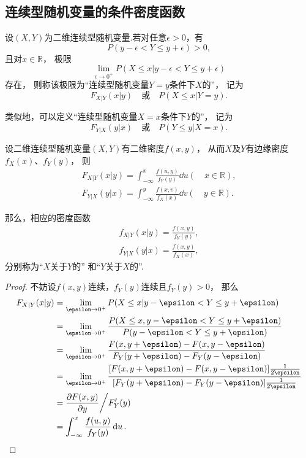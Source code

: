 \subsection{连续型随机变量的条件密度函数}
\begin{definition}
设\((X,Y)\)为二维连续型随机变量.若对任意\(\epsilon > 0\)，有\[
	P(y - \epsilon < Y \leq y + \epsilon) > 0,
\]
且对\(x\in\mathbb{R}\)，
极限\[
	\lim_{\epsilon\to0^+} P(X \leq x \vert y - \epsilon < Y \leq y + \epsilon)
\]存在，
则称该极限为“连续型随机变量\(Y=y\)条件下\(X\)的”，
记为\[
	F_{X \vert Y}(x \vert y)
	\quad\text{或}\quad
	P(X \leq x \vert Y = y).
\]

类似地，可以定义“连续型随机变量\(X=x\)条件下\(Y\)的”，
记为\[
	F_{Y \vert X}(y \vert x)
	\quad\text{或}\quad
	P(Y \leq y \vert X = x).
\]
\end{definition}

\begin{theorem}
设二维连续型随机变量\((X,Y)\)有二维密度\(f(x,y)\)，
从而\(X\)及\(Y\)有边缘密度\(f_X(x)\)、\(f_Y(y)\)，
则\begin{gather*}
	F_{X \vert Y}(x \vert y)
	= \int_{-\infty}^x \frac{f(u,y)}{f_Y(y)}\dd{u}
	(\quad x \in \mathbb{R}), \\
	F_{Y \vert X}(y \vert x)
	= \int_{-\infty}^y \frac{f(x,v)}{f_X(x)}\dd{v}
	(\quad y \in \mathbb{R}).
\end{gather*}

那么，相应的密度函数\begin{gather}
	f_{X \vert Y}(x \vert y)
	= \frac{f(x,y)}{f_Y(y)},
		\label{equation:多维随机变量及其分布.条件密度、联合密度、边缘密度的关系1} \\
	f_{Y \vert X}(y \vert x)
	= \frac{f(x,y)}{f_X(x)},
		\label{equation:多维随机变量及其分布.条件密度、联合密度、边缘密度的关系2}
\end{gather}
分别称为“\(X\)关于\(Y\)的”%
和“\(Y\)关于\(X\)的”.
\begin{proof}
不妨设\(f(x,y)\)连续，\(f_Y(y)\)连续且\(f_Y(y)>0\)，
\def\l{\lim_{\epsilon\to0^+}}%
那么\begin{align*}
	F_{X \vert Y}(x \vert y)
	&= \lim_{\epsilon\to0^+}
		P(X \leq x \vert y - \epsilon < Y \leq y + \epsilon) \\
	&= \lim_{\epsilon\to0^+}
		\frac{
			P(X \leq x, y - \epsilon < Y \leq y + \epsilon)
		}{
			P(y - \epsilon < Y \leq y + \epsilon)
		} \\
	&= \lim_{\epsilon\to0^+}
		\frac{
			F(x,y+\epsilon) - F(x,y-\epsilon)
		}{
			F_Y(y+\epsilon) - F_Y(y-\epsilon)
		} \\
	&= \lim_{\epsilon\to0^+}
		\frac{
			[F(x,y+\epsilon) - F(x,y-\epsilon)] \frac{1}{2 \epsilon}
		}{
			[F_Y(y+\epsilon) - F_Y(y-\epsilon)] \frac{1}{2 \epsilon}
		} \\
	&= \pdv{F(x,y)}{y} \bigg/ F_Y'(y) \\
	&= \int_{-\infty}^x \frac{f(u,y)}{f_Y(y)} \dd{u}.
	\qedhere
\end{align*}
\end{proof}
\end{theorem}

